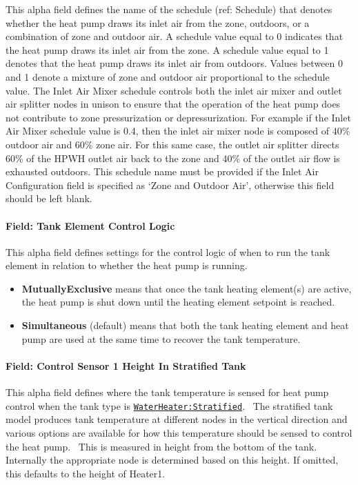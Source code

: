 This alpha field defines the name of the schedule (ref: Schedule) that denotes whether the heat pump draws its inlet air from the zone, outdoors, or a combination of zone and outdoor air. A schedule value equal to 0 indicates that the heat pump draws its inlet air from the zone. A schedule value equal to 1 denotes that the heat pump draws its inlet air from outdoors. Values between 0 and 1 denote a mixture of zone and outdoor air proportional to the schedule value. The Inlet Air Mixer schedule controls both the inlet air mixer and outlet air splitter nodes in unison to ensure that the operation of the heat pump does not contribute to zone pressurization or depressurization. For example if the Inlet Air Mixer schedule value is 0.4, then the inlet air mixer node is composed of 40\% outdoor air and 60\% zone air. For this same case, the outlet air splitter directs 60\% of the HPWH outlet air back to the zone and 40\% of the outlet air flow is exhausted outdoors. This schedule name must be provided if the Inlet Air Configuration field is specified as `Zone and Outdoor Air', otherwise this field should be left blank.

\paragraph{Field: Tank Element Control Logic}\label{field-tank-element-control-logic}

This alpha field defines settings for the control logic of when to run the tank element in relation to whether the heat pump is running.

\begin{itemize}
\tightlist
\item
  \textbf{MutuallyExclusive} means that once the tank heating element(s) are active, the heat pump is shut down until the heating element setpoint is reached.
\item
  \textbf{Simultaneous} (default) means that both the tank heating element and heat pump are used at the same time to recover the tank temperature.
\end{itemize}

\paragraph{Field: Control Sensor 1 Height In Stratified Tank}\label{field-control-sensor-1-height-in-stratified-tank}

This alpha field defines where the tank temperature is sensed for heat pump control when the tank type is \hyperref[waterheaterstratified]{\lstinline!WaterHeater:Stratified!}.~ The stratified tank model produces tank temperature at different nodes in the vertical direction and various options are available for how this temperature should be sensed to control the heat pump.~ This is measured in height from the bottom of the tank. Internally the appropriate node is determined based on this height. If omitted, this defaults to the height of Heater1.

